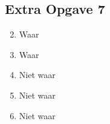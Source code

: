 \documentclass[11pt]{article}
\begin{document}
\subsection*{Extra Opgave 7}
\begin{enumerate}[label=\roman*]
  \setcounter{enumi}{1}
  \item Waar  %

  \setcounter{enumi}{3}
  \item Waar

  \setcounter{enumi}{5}
  \item Niet waar

  \setcounter{enumi}{7}
  \item Niet waar

  \setcounter{enumi}{9}
  \item Niet waar

\end{enumerate}
\end{document}
